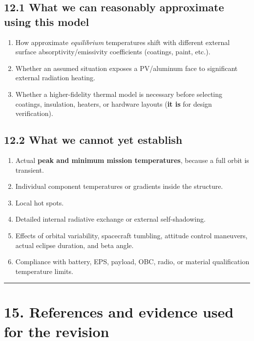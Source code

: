 \documentclass[
]{book}
\providecommand{\tightlist}{%
  \setlength{\itemsep}{0pt}\setlength{\parskip}{0pt}}
\begin{document}
\subsection{12.1 What we can reasonably approximate using this model}\label{what-we-can-reasonably-approximate-using-this-model}

\begin{enumerate}
\def\labelenumi{\arabic{enumi}.}
\tightlist
\item
  How approximate \emph{equilibrium} temperatures shift with different external surface absorptivity/emissivity coefficients (coatings, paint, etc.).
\item
  Whether an assumed situation exposes a PV/aluminum face to significant external radiation heating.
\item
  Whether a higher-fidelity thermal model is necessary before selecting coatings, insulation, heaters, or hardware layouts (\textbf{it is} for design verification).
\end{enumerate}

\subsection{12.2 What we cannot yet establish}\label{what-we-cannot-yet-establish}

\begin{enumerate}
\def\labelenumi{\arabic{enumi}.}
\tightlist
\item
  Actual \textbf{peak and minimum mission temperatures}, because a full orbit is transient.
\item
  Individual component temperatures or gradients inside the structure.
\item
  Local hot spots.
\item
  Detailed internal radiative exchange or external self-shadowing.
\item
  Effects of orbital variability, spacecraft tumbling, attitude control maneuvers, actual eclipse duration, and beta angle.
\item
  Compliance with battery, EPS, payload, OBC, radio, or material qualification temperature limits.
\end{enumerate}

\begin{center}\rule{0.5\linewidth}{0.5pt}\end{center}

\section{15. References and evidence used for the revision}\label{references-and-evidence-used-for-the-revision}
\end{document}
